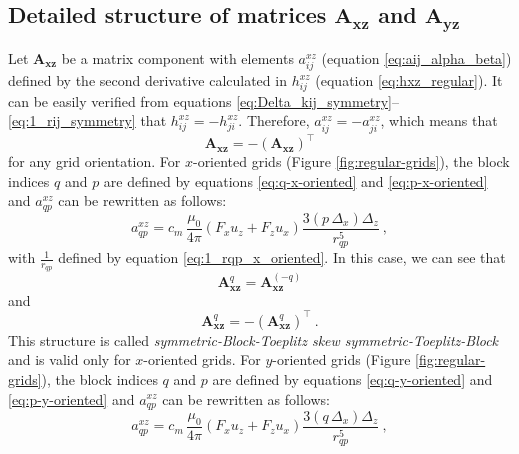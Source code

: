 \documentclass[manuscript,noblind]{geophysics}
\begin{document}
\subsection{Detailed structure of matrices $\mathbf{A_{xz}}$ and $\mathbf{A_{yz}}$}

Let $\mathbf{A}_{\boldsymbol{xz}}$ be a matrix component with elements
$a^{xz}_{ij}$ (equation \ref{eq:aij_alpha_beta}) defined by the second derivative calculated in
$h^{xz}_{ij}$ (equation \ref{eq:hxz_regular}). It can be easily verified from equations
\ref{eq:Delta_kij_symmetry}--\ref{eq:1_rij_symmetry} that $h^{xz}_{ij} = -h^{xz}_{ji}$.
Therefore, $a^{xz}_{ij} = -a^{xz}_{ji}$, which means that 
\begin{equation}
	\mathbf{A}_{\boldsymbol{xz}} = -\left( \mathbf{A}_{\boldsymbol{xz}} \right)^{\top}
	\label{eq:Axz_symmetry}
\end{equation} 
for any grid orientation.
For $x$-oriented grids (Figure \ref{fig:regular-grids}), the block indices $q$ and $p$ are defined 
by equations \ref{eq:q-x-oriented} and 
\ref{eq:p-x-oriented} and $a^{xz}_{qp}$ can be rewritten as follows:
\begin{equation}
	a^{xz}_{qp} = c_{m} \, \frac{\mu_{0}}{4\pi} 
	\left( F_{x} u_{z} + F_{z} u_{x} \right) \frac{3 \left( p \, \Delta_{x} \right) \Delta_{z}}{r_{qp}^{5}}
	\: ,
	\label{eq:aqp_xz_x_oriented}
\end{equation}
with $\tfrac{1}{r_{qp}}$ defined by equation \ref{eq:1_rqp_x_oriented}.
In this case, we can see that
\begin{equation}
	\mathbf{A}_{\boldsymbol{xz}}^{q} = \mathbf{A}_{\boldsymbol{xz}}^{(-q)}
	\label{eq:Axz_q_external_block_symmetry_x_oriented}
\end{equation}
and 
\begin{equation}
	\mathbf{A}_{\boldsymbol{xz}}^{q} = -\left( \mathbf{A}_{\boldsymbol{xz}}^{q} \right)^{\top} \: .
	\label{eq:Axz_q_internal_block_symmetry_x_oriented}
\end{equation}
This structure is called \textit{symmetric-Block-Toeplitz skew symmetric-Toeplitz-Block} and is 
valid only for $x$-oriented grids.
For $y$-oriented grids (Figure \ref{fig:regular-grids}), the block indices $q$ and $p$ are 
defined by equations \ref{eq:q-y-oriented} and 
\ref{eq:p-y-oriented} and $a^{xz}_{qp}$ can be rewritten as follows:
\begin{equation}
	a^{xz}_{qp} = c_{m} \, \frac{\mu_{0}}{4\pi} 
	\left( F_{x} u_{z} + F_{z} u_{x} \right) \frac{3 \left( q \, \Delta_{x} \right) \Delta_{z}}{r_{qp}^{5}} \: ,
	\label{eq:aqp_xz_y_oriented}
\end{equation}
\end{document}
